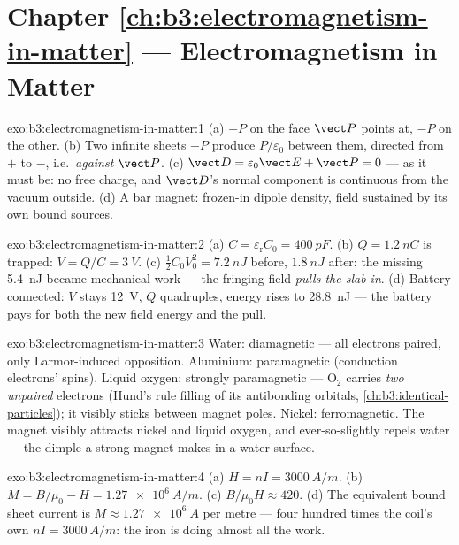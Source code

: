 \section*{Chapter \ref{ch:b3:electromagnetism-in-matter} --- Electromagnetism in Matter}

\begin{solution}{exo:b3:electromagnetism-in-matter:1}
(a) $+P$ on the face $\vect P$ points at, $-P$ on the other. (b)
Two infinite sheets $\pm P$ produce $P/\varepsilon_0$ between them,
directed from $+$ to $-$, i.e.\ \emph{against} $\vect P$. (c)
$\vect D = \varepsilon_0\vect E + \vect P = 0$ --- as it must be:
no free charge, and $\vect D$'s normal component is continuous from
the vacuum outside. (d) A bar magnet: frozen-in dipole density,
field sustained by its own bound sources.
\end{solution}

\begin{solution}{exo:b3:electromagnetism-in-matter:2}
(a) $C = \varepsilon_{\text{r}}C_0 = \qty{400}{pF}$. (b) $Q =
\qty{1.2}{nC}$ is trapped: $V = Q/C = \qty{3}{V}$. (c)
$\tfrac12C_0V_0^2 = \qty{7.2}{nJ}$ before, $\qty{1.8}{nJ}$ after:
the missing \qty{5.4}{nJ} became mechanical work --- the fringing
field \emph{pulls the slab in}. (d) Battery connected: $V$ stays
\qty{12}{V}, $Q$ quadruples, energy rises to \qty{28.8}{nJ} ---
the battery pays for both the new field energy and the pull.
\end{solution}

\begin{solution}{exo:b3:electromagnetism-in-matter:3}
Water: diamagnetic --- all electrons paired, only Larmor-induced
opposition. Aluminium: paramagnetic (conduction electrons' spins).
Liquid oxygen: strongly paramagnetic --- O$_2$ carries \emph{two
unpaired} electrons (Hund's rule filling of its antibonding
orbitals, \cref{ch:b3:identical-particles}); it visibly sticks
between magnet poles. Nickel: ferromagnetic. The magnet visibly
attracts nickel and liquid oxygen, and ever-so-slightly repels
water --- the dimple a strong magnet makes in a water surface.
\end{solution}

\begin{solution}{exo:b3:electromagnetism-in-matter:4}
(a) $H = nI = \qty{3000}{A/m}$. (b) $M = B/\mu_0 - H =
\qty{1.27e6}{A/m}$. (c) $B/\mu_0H \approx 420$. (d) The
equivalent bound sheet current is $M \approx \qty{1.27e6}{A}$ per
metre --- four hundred times the coil's own $nI = \qty{3000}{A/m}$:
the iron is doing almost all the work.
\end{solution}

